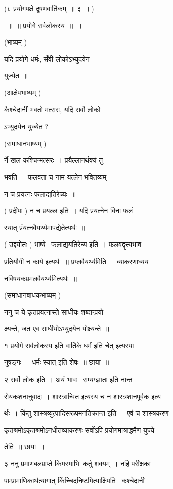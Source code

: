 \documentclass[11pt, openany]{book}
\begin{document}
(८ प्रयोगपक्षे दूषणवार्तिकम्~॥ ३~॥ ) 

~॥~॥ प्रयोगे सर्वलोकस्य~॥~॥ 

(भाष्यम् ) 

यदि प्रयोगे धर्मः, सँवी लोकोऽभ्युदयेन 

युज्येत~॥ 

(आक्षेपभाष्यम् ) 

कैश्चेदानीं भवतो मत्सरः, यदि सर्वो लोको \textendash\ 

ऽभ्युदयेन युज्येत ? 

(समाधानभाष्यम् ) 

र्ने खल कश्चिन्मत्सरः~। प्रयैल्लानर्थक्यं तु 

भवति~। फलवता च नाम यत्लेन भवितव्यम् 

न च प्रयत्नः फलाद्यतिरेच्यः~॥ 

( प्रदीपः ) न च प्रयल्ल इति~। यदि प्रयत्नेन विना फलं 

स्यात् प्रंयत्नवैयर्थ्यमापद्येतेत्यर्थः~॥ 

( उद्दयोतः ) भाष्ये \textendash\ फलाद्ययतिरेच्य इति~। फलवद्वृत्त्यभाव \textendash\ 

प्रतियौगी न कार्य इत्यर्थः~॥ प्रय्लवैयर्थ्यमिति~। व्याकरणाध्यय \textendash\ 

नविषयकप्रमलवैयर्थ्यमित्यर्थः~॥ 

(समाधानबाधकभाष्यम् ) 

ननु च ये कृतप्रयत्नास्ते साधीयः शब्दान्प्रयो \textendash\ 

क्ष्यन्ते, जत एव साधीयोऽभ्युदयेन योक्ष्यन्ते~॥ 



१ {\qt प्रयोगे सर्वलोकस्य} इति वार्तिके धर्मं इति चेत् इत्यस्या \textendash\ 

नुषङ्गः~। {\qt धर्मः स्यात्} इति शेषः~॥ छाया~॥ 

२ सर्वो लोक इति~। अयं भावः \textendash\ {\qt सम्यग्ज्ञातः} इति नान्त \textendash\ 

रोयकशनानुवादः~। शास्त्रान्वित इत्यस्य च न शास्त्रशानपूर्वक इत्य \textendash\ 

र्थः~। किंतु शास्त्रव्युत्पादिसरूपमनतिक्रान्त इति~। एवं च शास्त्रकरण \textendash\ 

कृतश्रमोऽकृतश्रमोऽनधीतव्याकरणः सर्वोऽपि प्रयोगमात्राद्धमैण युज्ये \textendash\ 

तेति~॥ छाया~॥ 

३ ननु प्रमाणबलप्राप्ते किमस्माभिः कर्तु शक्यम्~। नहि परीक्षका \textendash\ 

पाम्प्रामाणिकार्थत्यागात् किंच्चिदनिष्टमित्याक्षिपति \textendash\ कश्चेदानी 
\end{document}
